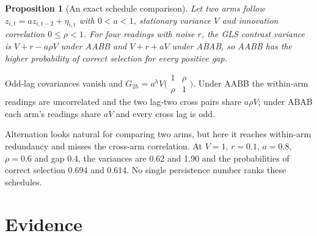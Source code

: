 \documentclass[conference]{IEEEtran}
\newtheorem{proposition}{Proposition}
\begin{document}
\begin{proposition}[An exact schedule comparison]\label{prop:ar2}
Let two arms follow $z_{i,t}=az_{i,t-2}+\eta_{i,t}$ with $0<a<1$, stationary variance $V$ and innovation correlation $0\le\rho<1$. For four readings with noise $r$, the GLS contrast variance is $V+r-a\rho V$ under AABB and $V+r+aV$ under ABAB, so AABB has the higher probability of correct selection for every positive gap.
\end{proposition}

\begin{IEEEproof}[Sketch]
Odd-lag covariances vanish and $G_{2h}=a^hV\big(\begin{smallmatrix}1&\rho\\\rho&1\end{smallmatrix}\big)$. Under AABB the within-arm readings are uncorrelated and the two lag-two cross pairs share $a\rho V$; under ABAB each arm's readings share $aV$ and every cross lag is odd.
\end{IEEEproof}

Alternation looks natural for comparing two arms, but here it reaches within-arm redundancy and misses the cross-arm correlation. At $V=1$, $r=0.1$, $a=0.8$, $\rho=0.6$ and gap $0.4$, the variances are 0.62 and 1.90 and the probabilities of correct selection 0.694 and 0.614. No single persistence number ranks these schedules.

\section{Evidence}\label{sec:evidence}
\end{document}
